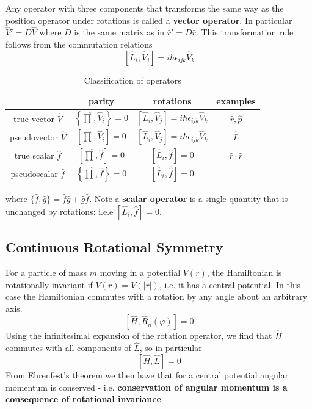 \documentclass[12pt, a4paper, oneside, openright, titlepage]{book}
\begin{document}
Any operator with three components that transforms the same way as the position operator under rotations is called a \textbf{vector operator}. In particular $\hat{V}' = D\hat{V}$ where $D$ is the same matrix as in $\hat{r}' = D\hat{r}$. This transformation rule follows from the commutation relations \begin{equation*}
    \boxed{\left[\hat{L}_i,\hat{V}_j\right] = i\hbar \epsilon_{ijk}\hat{V}_k}
\end{equation*}

\begin{table}[H]
    \centering
    \begin{tabular}{cccc}
        \hline \hline
         & parity & rotations & examples  \\ \hline
         true vector $\hat{V}$ & $\left\{\hat{\prod},\hat{V}_i\right\} = 0$ & $\left[\hat{L}_i,\hat{V}_j\right] = i\hbar \epsilon_{ijk}\hat{V}_k$ & $\hat{r},\hat{p}$ \\ 
         pseudovector $\hat{V}$ & $\left[\hat{\prod},\hat{V}_i\right] = 0$ & $\left[\hat{L}_i,\hat{V}_j\right] = i\hbar \epsilon_{ijk}\hat{V}_k$ & $\hat{L}$ \\
        true scalar $\hat{f}$ & $\left[\hat{\prod},\hat{f}\right] = 0$ & $\left[\hat{L}_i,\hat{f}\right] = 0$ & $\hat{r}\cdot\hat{r}$ \\
        pseudoscalar $\hat{f}$ & $\left\{\hat{\prod},\hat{f}\right\} = 0$ & $\left[\hat{L}_i,\hat{f}\right] = 0$ & \\
    \end{tabular}
    \caption{Classification of operators}
    \label{tab:class}
\end{table}

where $\{\hat{f},\hat{g}\} = \hat{f}\hat{g} + \hat{g}\hat{f}$. Note a \textbf{scalar operator} is a single quantity that is unchanged by rotations: i.e.e $\left[\hat{L}_i,\hat{f}\right] = 0$.


\subsection{Continuous Rotational Symmetry}

For a particle of mass $m$ moving in a potential $V(r)$, the Hamiltonian is rotationally invariant if $V(r) = V(|r|)$, i.e. it has a central potential. In this case the Hamiltonian commutes with a rotation by any angle about an arbitrary axis.\begin{equation*}
    \left[\hat{H},\hat{R}_n(\varphi)\right] = 0
\end{equation*}
Using the infinitesimal expansion of the rotation operator, we find that $\hat{H}$ commutes with all components of $\hat{L}$, so in particular $$\left[\hat{H},\hat{L}\right] = 0$$
From Ehrenfest's theorem we then have that for a central potential angular momentum is conserved - i.e. \textbf{conservation of angular momentum is a consequence of rotational invariance}.
\end{document}
